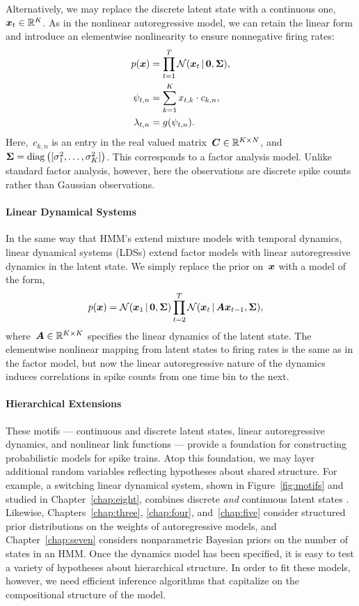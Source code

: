 Alternatively, we may replace the discrete latent state with a continuous
one,~$\boldsymbol{x}_t \in \mathbb{R}^K$. As in the nonlinear autoregressive model,
we can retain the linear form and introduce an elementwise nonlinearity
to ensure nonnegative firing rates:
\begin{align*}
  p(\boldsymbol{x}) &= \prod_{t=1}^T \mathcal{N}(\boldsymbol{x}_t \,|\, \boldsymbol{0}, \boldsymbol{\Sigma}), \\
  \psi_{t,n} &= \sum_{k=1}^K x_{t,k} \cdot c_{k,n},  \\
  \lambda_{t,n} &= g(\psi_{t,n}).
\end{align*}
Here,~$c_{k,n}$ is an entry in the real valued matrix~$\boldsymbol{C} \in
\mathbb{R}^{K \times N}$, and~${\boldsymbol{\Sigma} = \mathrm{diag} \left([ \sigma^2_1,
    \ldots, \sigma^2_K ] \right)}$.  This corresponds to a factor
analysis model. Unlike standard factor analysis, however, here the
observations are discrete spike counts rather than Gaussian
observations.

\paragraph{Linear Dynamical Systems}
In the same way that HMM's extend mixture models with temporal
dynamics, linear dynamical systems (LDSs) extend factor models with
linear autoregressive dynamics in the latent state.  We simply replace
the prior on~$\boldsymbol{x}$ with a model of the form,
\begin{align*}
  p(\boldsymbol{x}) &= \mathcal{N}(\boldsymbol{x}_1 \,|\, \boldsymbol{0}, \boldsymbol{\Sigma}) \prod_{t=2}^T \mathcal{N}(\boldsymbol{x}_t \,|\, \boldsymbol{A} \boldsymbol{x}_{t-1}, \boldsymbol{\Sigma}),
\end{align*}
where~$\boldsymbol{A} \in \mathbb{R}^{K \times K}$ specifies the linear dynamics of
the latent state.  The elementwise nonlinear mapping from latent
states to firing rates is the same as in the factor model, but now the
linear autoregressive nature of the dynamics induces correlations in
spike counts from one time bin to the next.


\paragraph{Hierarchical Extensions}
These motifs --- continuous and discrete latent states, linear autoregressive 
dynamics, and nonlinear link functions --- provide a foundation for 
constructing probabilistic models for spike trains. Atop this foundation,
we may layer additional random variables reflecting hypotheses about shared 
structure. For example, a switching linear dynamical system, shown in Figure~\ref{fig:motifs}
and studied in Chapter~\ref{chap:eight},
combines discrete \emph{and} continuous latent states \citep{murphy2012probabilistic, fox2009bayesian}. 
Likewise, Chapters~\ref{chap:three}, \ref{chap:four},
and~\ref{chap:five} consider structured prior distributions on 
the weights of autoregressive models, and Chapter~\ref{chap:seven} considers 
nonparametric Bayesian priors on the number of states in an HMM. Once the 
dynamics model has been specified, it is easy to test a variety of hypotheses
about hierarchical structure. In order to fit these models, however, we need 
efficient inference algorithms that capitalize on the compositional structure 
of the model.


